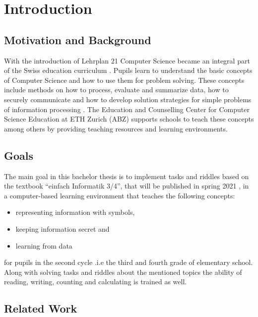 \chapter{Introduction}

\section{Motivation and Background}

With the introduction of Lehrplan 21 Computer Science became an integral part of the Swiss education curriculum \cite{Lehrplan21}. Pupils learn to understand the basic concepts of Computer Science and how to use them for problem solving. These concepts include methods on how to process, evaluate and summarize data, how to securely communicate and how to develop solution strategies for simple problems of information processing \cite{MedienUndInformatik}. The Education and Counselling Center for Computer Science Education at ETH Zurich (ABZ) supports schools to teach these concepts among others by providing teaching resources and learning environments.

\section{Goals}

The main goal in this bachelor thesis is to implement tasks and riddles based on the textbook “einfach Informatik 3/4”, that will be published in spring 2021 \cite{EinfachInformatik}, in a computer-based learning environment that teaches the following concepts:

\begin{itemize}
    \item representing information with symbols,
    \item keeping information secret and
    \item learning from data
\end{itemize}

for pupils in the second cycle .i.e the third and fourth grade of elementary school.
Along with solving tasks and riddles about the mentioned topics the ability of reading, writing, counting and calculating is trained as well.

\section{Related Work}


